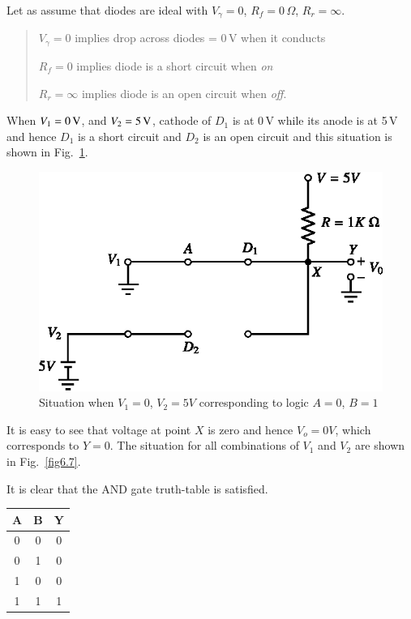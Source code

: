 Let as assume that diodes are ideal with $V_{\gamma}=0$, $R_{f}=0\,\Omega$, $R_{r}=\infty$.
\begin{quote}
$V_{\gamma}=0$ implies drop across diodes = 0\,V when it conducts

$R_{f}=0$ implies diode is a short circuit when {\em on}

$R_{r}=\infty$ implies diode is an open circuit when {\em off}.
\end{quote}

When $V_{1}=0\text{\,V}$, and $V_{2}=5\text{\,V}$, cathode of $D_{1}$ is at 0\,V while its anode is at 5\,V and hence $D_{1}$ is a short circuit and $D_{2}$ is an open circuit and this situation is shown in Fig.~\ref{fig6.6}.
\begin{figure}[H]
\centering
\includegraphics{chap6/fig80_6.6.eps}
\caption{Situation when $V_{1}=0$, $V_{2}=5V$ corresponding to logic $A=0$, $B=1$}\label{fig6.6}
\end{figure}

It is easy to see that voltage at point $X$ is zero and hence $V_{o}=0V$, which corresponds to $Y=0$. The situation for all combinations of $V_{1}$ and $V_{2}$ are shown in Fig.~\ref{fig6.7}.

It is clear that the AND gate truth-table is satisfied.
\begin{center}
\tabcolsep=8pt
\renewcommand{\arraystretch}{1.2}
\begin{tabular}{|cc|c|}
\hline
{\bf A} & {\bf B} & {\bf Y}\\
\hline
0 & 0 & 0\\
0 & 1 & 0\\
1 & 0 & 0\\
1 & 1 & 1\\
\hline
\end{tabular}
\end{center}

